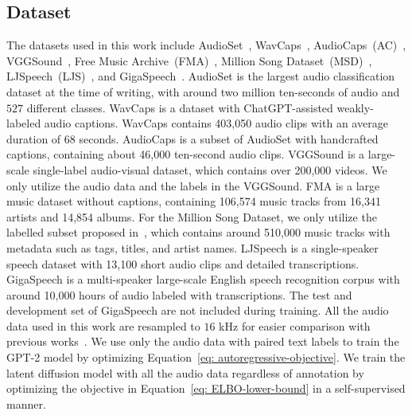 \documentclass[lettersize,journal]{IEEEtran}
\begin{document}
\subsection{Dataset} 
\noindent
The datasets used in this work include AudioSet~\cite{gemmeke2017audio}, WavCaps~\cite{mei2023wavcaps}, AudioCaps~(AC)~\cite{kim2019audiocaps}, VGGSound~\cite{chen2020vggsound}, Free Music Archive~(FMA)~\cite{defferrard2016fma}, Million Song Dataset~(MSD)~\cite{bertin2011million}, LJSpeech~(LJS)~\cite{ljspeech17}, and GigaSpeech~\cite{chen2021gigaspeech}. AudioSet is the largest audio classification dataset at the time of writing, with around two million ten-seconds of audio and $527$ different classes. 
WavCaps is a dataset with ChatGPT-assisted weakly-labeled audio captions. WavCaps contains 403,050 audio clips with an average duration of 68 seconds. AudioCaps is a subset of AudioSet with handcrafted captions, containing about 46,000 ten-second audio clips. VGGSound is a large-scale single-label audio-visual dataset, which contains over 200,000 videos. We only utilize the audio data and the labels in the VGGSound. FMA is a large music dataset without captions, containing 106,574 music tracks from 16,341 artists and 14,854 albums. For the Million Song Dataset, we only utilize the labelled subset proposed in~\cite{toward2022doh-ecals}, which contains around 510,000 music tracks with metadata such as tags, titles, and artist names. LJSpeech is a single-speaker speech dataset with 13,100 short audio clips and detailed transcriptions. 
GigaSpeech is a multi-speaker large-scale English speech recognition corpus with around 10,000 hours of audio labeled with transcriptions. The test and development set of GigaSpeech are not included during training. All the audio data used in this work are resampled to $16$ kHz for easier comparison with previous works~\cite{liu2023audioldm, huang2023make-an-audio}. We use only the audio data with paired text labels to train the GPT-2 model by optimizing Equation~\eqref{eq: autoregressive-objective}. We train the latent diffusion model with all the audio data regardless of annotation by optimizing the objective in Equation~\eqref{eq: ELBO-lower-bound} in a self-supervised manner.
\end{document}
